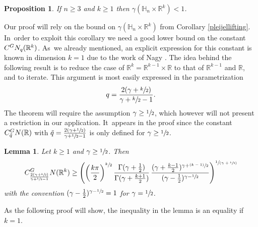 \documentclass[11pt]{article}
\let\oldsfrac\sfrac
\renewcommand{\sfrac}[2]{{\oldsfrac{#1}{#2}}}
\newcommand{\psfrac}[2]{{\sfrac{(#1)}{#2}}}
\newcommand{\spfrac}[2]{{\sfrac{#1}{(#2)}}}
\newcommand{\GN}{\textup{GN}}
\newtheorem{proposition}[theorem]{Proposition}
\newtheorem{lemma}[theorem]{Lemma}
\theoremstyle{definition}
\newcommand{\1}{\mathbbm{1}}
\newcommand{\R}{\mathbb{R}}
\numberwithin{equation}{section}
\begin{document}
\begin{proposition}\label{largedimension}
If $n\geq 3$ and $k\geq 1$ then $\gamma(\mathbb H_n\times\R^k)<1$.
\end{proposition}

Our proof will rely on the bound on $\gamma(\mathbb H_n\times\R^k)$ from Corollary \ref{pleijellifting}. In~order to exploit this corollary we need a good lower bound on the constant $C^\GN_q(\R^k)$. As~we already mentioned, an explicit expression for this constant is known in dimension $k=1$ due to the work of Nagy \cite{Na}. The idea behind the following result is to reduce the case of $\R^k=\R^{k-1}\times\R$ to that of $\R^{k-1}$ and $\R$, and to iterate. This argument is most easily expressed in the parametrization
\[
q=\frac{2(\gamma+\sfrac k2)}{\gamma+\sfrac k2 -1}.
\]
The theorem will require the assumption $\gamma\geq\sfrac12$, which however will not present a restriction in our application. It~appears in the proof since the constant $C_{\tilde q}^\GN(\R)$ with $\tilde q= \frac{2(\gamma+\sfrac 12)}{\gamma+\sfrac 12 -1}$ is only defined for $\gamma\geq\sfrac12$.

\begin{lemma}
Let $k\geq 1$ and $\gamma\geq\sfrac12$. Then
\[
C_{\frac{2(\gamma+\sfrac k2)}{\gamma+\sfrac k2-1}}^\GN(\R^k) \geq \left(\left(\frac{k\pi}{2}\right)^{\sfrac k2} \frac{\Gamma(\gamma+\frac12)}{\Gamma(\gamma+\frac{k+1}2)} \,\frac{(\gamma+\frac{k-1}{2})^{\gamma+\psfrac{k-1}2}}{(\gamma-\frac12)^{\gamma-\sfrac12}}\right)^{\spfrac{1}{\gamma+\sfrac k2}}
\]
with the convention $(\gamma-\frac12)^{\gamma-\sfrac12}=1$ for $\gamma=\sfrac12$.
\end{lemma}

As the following proof will show, the inequality in the lemma is an equality if $k=1$.
\end{document}
